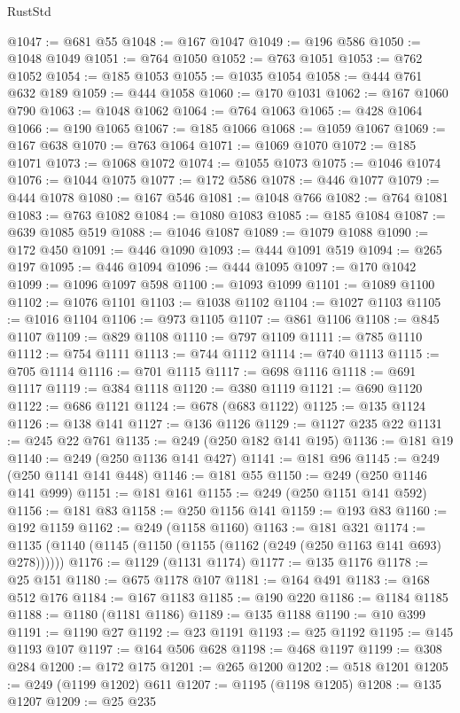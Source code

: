 \begin{lexlean}{RustStd}
\begin{coremodule}
{\begin{coremodule}
{{{{{{{{{{{{{{{{{{{{{{{{{{{{{{{{{{@1047 := @681 @55
@1048 := @167 @1047
@1049 := @196 @586
@1050 := @1048 @1049
@1051 := @764 @1050
@1052 := @763 @1051
@1053 := @762 @1052
@1054 := @185 @1053
@1055 := @1035 @1054
@1058 := @444 @761 @632 @189
@1059 := @444 @1058
@1060 := @170 @1031
@1062 := @167 @1060 @790
@1063 := @1048 @1062
@1064 := @764 @1063
@1065 := @428 @1064
@1066 := @190 @1065
@1067 := @185 @1066
@1068 := @1059 @1067
@1069 := @167 @638
@1070 := @763 @1064
@1071 := @1069 @1070
@1072 := @185 @1071
@1073 := @1068 @1072
@1074 := @1055 @1073
@1075 := @1046 @1074
@1076 := @1044 @1075
@1077 := @172 @586
@1078 := @446 @1077
@1079 := @444 @1078
@1080 := @167 @546
@1081 := @1048 @766
@1082 := @764 @1081
@1083 := @763 @1082
@1084 := @1080 @1083
@1085 := @185 @1084
@1087 := @639 @1085 @519
@1088 := @1046 @1087
@1089 := @1079 @1088
@1090 := @172 @450
@1091 := @446 @1090
@1093 := @444 @1091 @519
@1094 := @265 @197
@1095 := @446 @1094
@1096 := @444 @1095
@1097 := @170 @1042
@1099 := @1096 @1097 @598
@1100 := @1093 @1099
@1101 := @1089 @1100
@1102 := @1076 @1101
@1103 := @1038 @1102
@1104 := @1027 @1103
@1105 := @1016 @1104
@1106 := @973 @1105
@1107 := @861 @1106
@1108 := @845 @1107
@1109 := @829 @1108
@1110 := @797 @1109
@1111 := @785 @1110
@1112 := @754 @1111
@1113 := @744 @1112
@1114 := @740 @1113
@1115 := @705 @1114
@1116 := @701 @1115
@1117 := @698 @1116
@1118 := @691 @1117
@1119 := @384 @1118
@1120 := @380 @1119
@1121 := @690 @1120
@1122 := @686 @1121
@1124 := @678 (@683 @1122)
@1125 := @135 @1124
@1126 := @138 @141
@1127 := @136 @1126
@1129 := @1127 @235 @22
@1131 := @245 @22 @761
@1135 := @249 (@250 @182 @141 @195)
@1136 := @181 @19
@1140 := @249 (@250 @1136 @141 @427)
@1141 := @181 @96
@1145 := @249 (@250 @1141 @141 @448)
@1146 := @181 @55
@1150 := @249 (@250 @1146 @141 @999)
@1151 := @181 @161
@1155 := @249 (@250 @1151 @141 @592)
@1156 := @181 @83
@1158 := @250 @1156 @141
@1159 := @193 @83
@1160 := @192 @1159
@1162 := @249 (@1158 @1160)
@1163 := @181 @321
@1174 := @1135 (@1140 (@1145 (@1150 (@1155 (@1162 (@249 (@250 @1163 @141 @693) @278))))))
@1176 := @1129 (@1131 @1174)
@1177 := @135 @1176
@1178 := @25 @151
@1180 := @675 @1178 @107
@1181 := @164 @491
@1183 := @168 @512 @176
@1184 := @167 @1183
@1185 := @190 @220
@1186 := @1184 @1185
@1188 := @1180 (@1181 @1186)
@1189 := @135 @1188
@1190 := @10 @399
@1191 := @1190 @27
@1192 := @23 @1191
@1193 := @25 @1192
@1195 := @145 @1193 @107
@1197 := @164 @506 @628
@1198 := @468 @1197
@1199 := @308 @284
@1200 := @172 @175
@1201 := @265 @1200
@1202 := @518 @1201
@1205 := @249 (@1199 @1202) @611
@1207 := @1195 (@1198 @1205)
@1208 := @135 @1207
@1209 := @25 @235
}}}}}}}}}}}}}}}}}}}}}}}}}}}}}}}}}}
\end{coremodule}}
\end{coremodule}
\end{lexlean}
